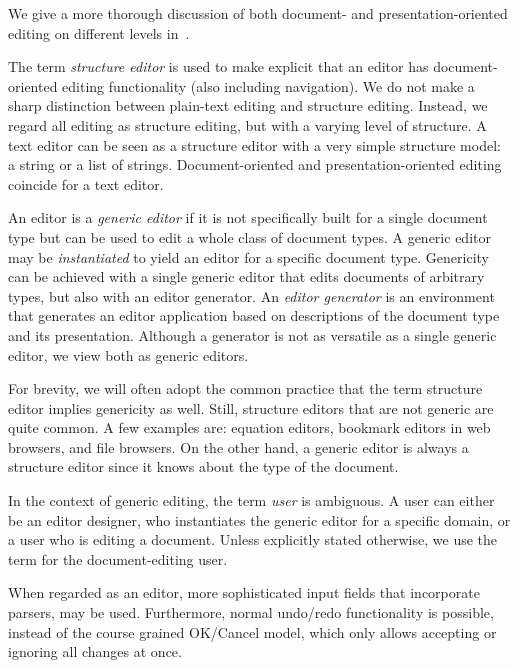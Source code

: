 \documentclass{speauth}
\begin{document}
We give a more thorough discussion of both document- and presentation-oriented  editing on different levels in~\cite{proximaarch}. 


The term {\em structure editor} is used to make explicit that an editor has document-oriented editing functionality (also including navigation). We do not make a sharp distinction between plain-text editing and structure editing. Instead, we regard all editing as structure editing, but with a varying level of structure. A text editor can be seen as a structure editor with a very simple structure model: a string or a list of strings. Document-oriented and presentation-oriented editing coincide for a text editor.

An editor is a {\em generic editor} if it is not specifically built for a single document type but can be used to edit a whole class of document types. A generic editor may be {\em instantiated} to yield an editor for a specific document type. Genericity can be achieved with a single generic editor that edits documents of arbitrary types, but also with an editor generator. An {\em editor generator} is an environment that generates an editor application based on descriptions of the document type and its presentation. Although a generator is not as versatile as a single generic editor, we view both as generic editors. 

For brevity, we will often adopt the common practice that the term structure editor implies genericity as well. Still, structure editors that are not generic are quite common. A few examples are: equation editors, bookmark editors in web browsers, and file browsers. On the other hand, a generic editor is always a structure editor since it knows about the type of the document.

In the context of generic editing, the term {\em user} is ambiguous. A user can either be an editor designer, who instantiates the generic editor for a specific domain, or a user who is editing a document. Unless explicitly stated otherwise, we use the term for the document-editing user.

\bc

When regarded as an editor, more sophisticated input fields that incorporate parsers, may be used. Furthermore, normal undo/redo functionality is possible, instead of the course grained OK/Cancel model, which only allows accepting or ignoring all changes at once.

\ec
\end{document}
